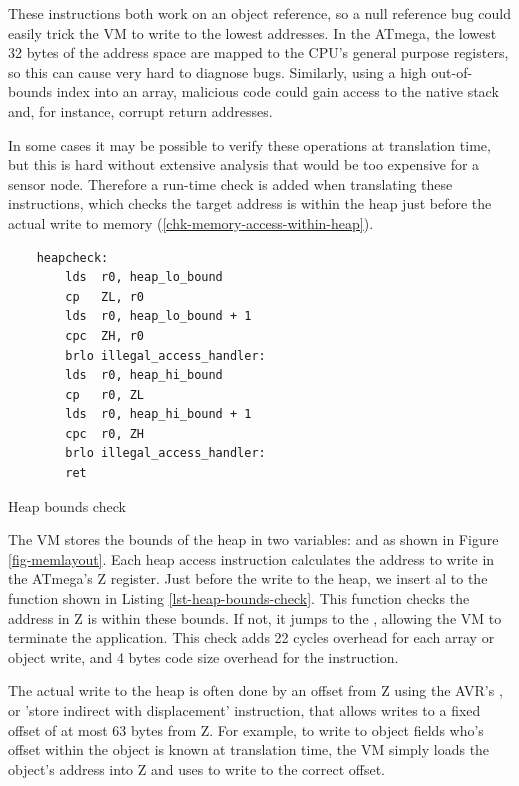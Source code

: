 These instructions both work on an object reference, so a null reference bug could easily trick the VM to write to the lowest addresses. In the ATmega, the lowest 32 bytes of the address space are mapped to the CPU's general purpose registers, so this can cause very hard to diagnose bugs. Similarly, using a high out-of-bounds index into an array, malicious code could gain access to the native stack and, for instance, corrupt return addresses.

In some cases it may be possible to verify these operations at translation time, but this is hard without extensive analysis that would be too expensive for a sensor node. Therefore a run-time check is added when translating these instructions, which checks the target address is within the heap just before the actual write to memory (\ref{chk-memory-access-within-heap}).

\begin{listing}
    \centering
    \begin{verbatim}
    heapcheck:
        lds  r0, heap_lo_bound
        cp   ZL, r0
        lds  r0, heap_lo_bound + 1
        cpc  ZH, r0
        brlo illegal_access_handler:
        lds  r0, heap_hi_bound
        cp   r0, ZL
        lds  r0, heap_hi_bound + 1
        cpc  r0, ZH
        brlo illegal_access_handler:
        ret
    \end{verbatim}
    \caption{Heap bounds check}
    \label{lst-heap-bounds-check}
\end{listing}

The VM stores the bounds of the heap in two variables:  and  as shown in Figure \ref{fig-memlayout}. Each heap access instruction calculates the address to write in the ATmega's Z register. Just before the write to the heap, we insert al  to the  function shown in Listing \ref{lst-heap-bounds-check}. This function checks the address in Z is within these bounds. If not, it jumps to the , allowing the VM to terminate the application. This check adds 22 cycles overhead for each array or object write, and 4 bytes code size overhead for the  instruction.

The actual write to the heap is often done by an offset from Z using the AVR's , or 'store indirect with displacement' instruction, that allows writes to a fixed offset of at most 63 bytes from Z. For example, to write to object fields who's offset within the object is known at translation time, the VM simply loads the object's address into Z and uses  to write to the correct offset.

